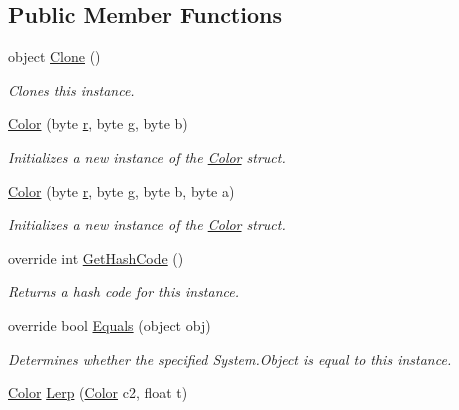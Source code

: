 \subsection*{Public Member Functions}
\begin{DoxyCompactItemize}
\item 
object \hyperlink{struct_lerp2_a_p_i_1_1_optimizers_1_1_color_ac0f67a153a803006379ac9fb192b897c}{Clone} ()
\begin{DoxyCompactList}\small\item\em Clones this instance. \end{DoxyCompactList}\item 
\hyperlink{struct_lerp2_a_p_i_1_1_optimizers_1_1_color_acaad4a6bc34a1590d543534a835930cc}{Color} (byte \hyperlink{struct_lerp2_a_p_i_1_1_optimizers_1_1_color_a222f7d917e0a461a91448f06ce9501d6}{r}, byte g, byte b)
\begin{DoxyCompactList}\small\item\em Initializes a new instance of the \hyperlink{struct_lerp2_a_p_i_1_1_optimizers_1_1_color}{Color} struct. \end{DoxyCompactList}\item 
\hyperlink{struct_lerp2_a_p_i_1_1_optimizers_1_1_color_a8b25d204d1a1d6b127bb1463c8dd0fdd}{Color} (byte \hyperlink{struct_lerp2_a_p_i_1_1_optimizers_1_1_color_a222f7d917e0a461a91448f06ce9501d6}{r}, byte g, byte b, byte a)
\begin{DoxyCompactList}\small\item\em Initializes a new instance of the \hyperlink{struct_lerp2_a_p_i_1_1_optimizers_1_1_color}{Color} struct. \end{DoxyCompactList}\item 
override int \hyperlink{struct_lerp2_a_p_i_1_1_optimizers_1_1_color_a20fce2c3b5954502dd2c24dded3fb8a0}{Get\+Hash\+Code} ()
\begin{DoxyCompactList}\small\item\em Returns a hash code for this instance. \end{DoxyCompactList}\item 
override bool \hyperlink{struct_lerp2_a_p_i_1_1_optimizers_1_1_color_a55480c74fb3575d3be5db1fef4bcb3d3}{Equals} (object obj)
\begin{DoxyCompactList}\small\item\em Determines whether the specified System.\+Object is equal to this instance. \end{DoxyCompactList}\item 
\hyperlink{struct_lerp2_a_p_i_1_1_optimizers_1_1_color}{Color} \hyperlink{struct_lerp2_a_p_i_1_1_optimizers_1_1_color_aabc594bf2cd7ca79d786768a872038f2}{Lerp} (\hyperlink{struct_lerp2_a_p_i_1_1_optimizers_1_1_color}{Color} c2, float t)

\end{DoxyCompactItemize}
